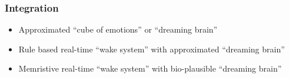 \documentclass[12pt, aspectratio=169]{beamer}
\begin{document}

\begin{frame}
  \frametitle{Integration}
  
\begin{itemize}
  \item Approximated ``cube of emotions'' or ``dreaming brain''
  \item Rule based real-time ``wake system'' with approximated ``dreaming brain''
  \item Memristive real-time ``wake system'' with bio-plausible ``dreaming brain''
\end{itemize}

\end{frame}

\end{document}
